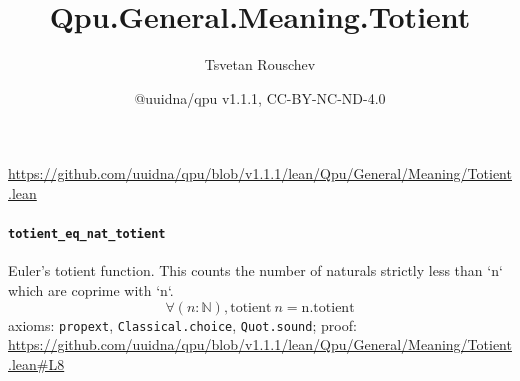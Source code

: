 \documentclass[11pt]{article}
\title{Qpu.General.Meaning.Totient}
\author{Tsvetan Rouschev}
\date{@uuidna/qpu v1.1.1, CC-BY-NC-ND-4.0}
\begin{document}
\maketitle
\noindent\url{https://github.com/uuidna/qpu/blob/v1.1.1/lean/Qpu/General/Meaning/Totient.lean}

\paragraph{\texttt{totient\_eq\_nat\_totient}}
Euler's totient function. This counts the number of naturals strictly less than `n` which are coprime with `n`.
\[ \forall (n : \mathbb{N}), \mathrm{totient}\ n = \mathrm{n.totient} \]
\noindent axioms: \texttt{propext}, \texttt{Classical.choice}, \texttt{Quot.sound}; proof: \url{https://github.com/uuidna/qpu/blob/v1.1.1/lean/Qpu/General/Meaning/Totient.lean\#L8}
\end{document}
